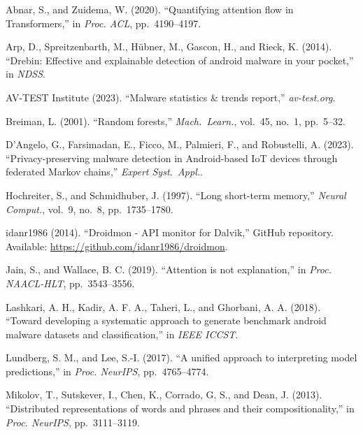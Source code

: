 \documentclass[12pt]{article}
\begin{document}
\begin{thebibliography}{}

Abnar, S., and Zuidema, W. (2020).
``Quantifying attention flow in Transformers,''
in \textit{Proc. ACL}, pp.\ 4190--4197.

Arp, D., Spreitzenbarth, M., H\"{u}bner, M., Gascon, H., and Rieck, K. (2014).
``Drebin: Effective and explainable detection of android malware in your pocket,''
in \textit{NDSS}.

AV-TEST Institute (2023).
``Malware statistics \& trends report,''
\textit{av-test.org}.

Breiman, L. (2001).
``Random forests,''
\textit{Mach.\ Learn.}, vol.\ 45, no.\ 1, pp.\ 5--32.

D'Angelo, G., Farsimadan, E., Ficco, M., Palmieri, F., and Robustelli, A. (2023).
``Privacy-preserving malware detection in Android-based IoT devices through federated Markov chains,''
\textit{Expert Syst.\ Appl.}.

Hochreiter, S., and Schmidhuber, J. (1997).
``Long short-term memory,''
\textit{Neural Comput.}, vol.\ 9, no.\ 8, pp.\ 1735--1780.

idanr1986 (2014).
``Droidmon - API monitor for Dalvik,''
GitHub repository. Available: \url{https://github.com/idanr1986/droidmon}.

Jain, S., and Wallace, B. C. (2019).
``Attention is not explanation,''
in \textit{Proc. NAACL-HLT}, pp.\ 3543--3556.

Lashkari, A. H., Kadir, A. F. A., Taheri, L., and Ghorbani, A. A. (2018).
``Toward developing a systematic approach to generate benchmark android malware datasets and classification,''
in \textit{IEEE ICCST}.

Lundberg, S. M., and Lee, S.-I. (2017).
``A unified approach to interpreting model predictions,''
in \textit{Proc. NeurIPS}, pp.\ 4765--4774.

Mikolov, T., Sutskever, I., Chen, K., Corrado, G. S., and Dean, J. (2013).
``Distributed representations of words and phrases and their compositionality,''
in \textit{Proc. NeurIPS}, pp.\ 3111--3119.


\end{thebibliography}
\end{document}
